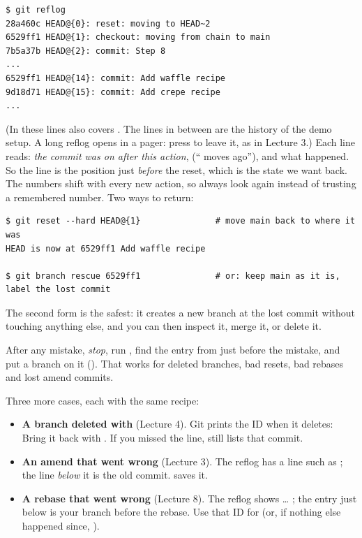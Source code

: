 \begin{lstlisting}
$ git reflog
28a460c HEAD@{0}: reset: moving to HEAD~2
6529ff1 HEAD@{1}: checkout: moving from chain to main
7b5a37b HEAD@{2}: commit: Step 8
...
6529ff1 HEAD@{14}: commit: Add waffle recipe
9d18d71 HEAD@{15}: commit: Add crepe recipe
...
\end{lstlisting}

(In these lines  also covers . The lines in between are the history of the demo setup. A long reflog opens in a pager: press  to leave it, as in Lecture 3.) Each line reads: \emph{the commit  was on after this action},  (`` moves ago''), and what happened. So the line  is the position just \emph{before} the reset, which is the state we want back. The numbers shift with every new action, so always look again instead of trusting a remembered number. Two ways to return:

\begin{lstlisting}
$ git reset --hard HEAD@{1}               # move main back to where it was
HEAD is now at 6529ff1 Add waffle recipe

$ git branch rescue 6529ff1               # or: keep main as it is, label the lost commit
\end{lstlisting}

The second form is the safest: it creates a new branch  at the lost commit without touching anything else, and you can then inspect it, merge it, or delete it.

\begin{keyidea}
After any mistake, \emph{stop}, run , find the entry from just before the mistake, and put a branch on it (). That works for deleted branches, bad resets, bad rebases and lost amend commits.
\end{keyidea}

Three more cases, each with the same recipe:

\begin{itemize}
  \item \textbf{A branch deleted with } (Lecture 4). Git prints the ID when it deletes:  Bring it back with . If you missed the line,  still lists that commit.
  \item \textbf{An amend that went wrong} (Lecture 3). The reflog has a line such as ; the line \emph{below} it is the old commit.  saves it.
  \item \textbf{A rebase that went wrong} (Lecture 8). The reflog shows  \ldots{} ; the entry just below  is your branch before the rebase. Use that ID for  (or, if nothing else happened since, ).
\end{itemize}

